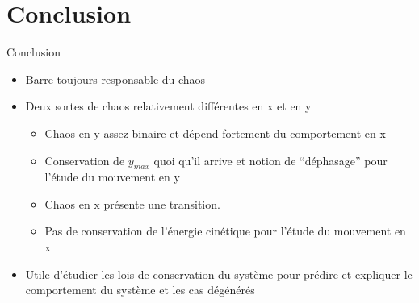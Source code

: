 \documentclass{beamer}
\begin{document}
  \section{Conclusion}
  
  \begin{frame}{Conclusion}
  \begin{itemize}
    \item Barre toujours responsable du chaos
    \item Deux sortes de chaos relativement différentes en x et en y
    \begin{itemize}
      \item Chaos en y assez binaire et dépend fortement du comportement en x
      \item Conservation de \(y_{max}\) quoi qu'il arrive et notion de ``déphasage'' pour l'étude du mouvement en y
      \pause \item Chaos en x présente une transition.
      \item Pas de conservation de l'énergie cinétique pour l'étude du mouvement en x
    \end{itemize}
    \item Utile d'étudier les lois de conservation du système pour prédire et expliquer le comportement du système et les cas dégénérés
  \end{itemize}
  \begin{center}
  \end{center}
  \end{frame}
  
\end{document}

